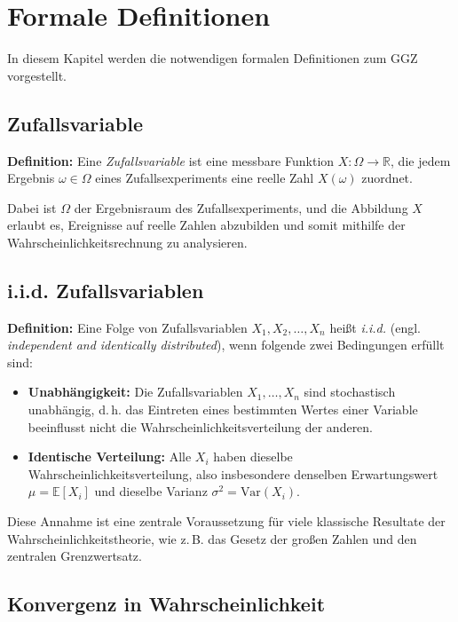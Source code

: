 \documentclass[aodsor,preprint]{imsart}
\numberwithin{equation}{section}
\theoremstyle{plain}
\begin{document}
\section{Formale Definitionen}
\label{sec:definitionen}


In diesem Kapitel werden die notwendigen formalen Definitionen zum GGZ vorgestellt.


\subsection{Zufallsvariable}

\textbf{Definition:}
Eine \emph{Zufallsvariable} ist eine messbare Funktion \( X \colon \Omega \to \mathbb{R} \), die jedem Ergebnis \(\omega \in \Omega\) eines Zufallsexperiments eine reelle Zahl \(X(\omega)\) zuordnet.

Dabei ist \(\Omega\) der Ergebnisraum des Zufallsexperiments, und die Abbildung \(X\) erlaubt es, Ereignisse auf reelle Zahlen abzubilden und somit mithilfe der Wahrscheinlichkeitsrechnung zu analysieren.


\subsection{i.i.d. Zufallsvariablen}

\textbf{Definition:}
Eine Folge von Zufallsvariablen \( X_1, X_2, \dots, X_n \) heißt \emph{i.i.d.} (engl. \emph{independent and identically distributed}), wenn folgende zwei Bedingungen erfüllt sind:

\begin{itemize}
  \item \textbf{Unabhängigkeit:} Die Zufallsvariablen \( X_1, \dots, X_n \) sind stochastisch unabhängig, d.\,h. das Eintreten eines bestimmten Wertes einer Variable beeinflusst nicht die Wahrscheinlichkeitsverteilung der anderen.
  \item \textbf{Identische Verteilung:} Alle \( X_i \) haben dieselbe Wahrscheinlichkeitsverteilung, also insbesondere denselben Erwartungswert \( \mu = \mathbb{E}[X_i] \) und dieselbe Varianz \( \sigma^2 = \text{Var}(X_i) \).
\end{itemize}

Diese Annahme ist eine zentrale Voraussetzung für viele klassische Resultate der Wahrscheinlichkeitstheorie, wie z.\,B. das Gesetz der großen Zahlen und den zentralen Grenzwertsatz.


\subsection{Konvergenz in Wahrscheinlichkeit}
\end{document}

